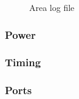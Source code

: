 \documentclass[a4paper,11pt]{article}%
\begin{document}
\begin{figure}[h]
	\centering
	\caption{Area log file}
	\label{fig:area_log}
\end{figure}


\subsubsection{Power}
\subsubsection{Timing}
\subsubsection{Ports}

\pagebreak



\end{document}

